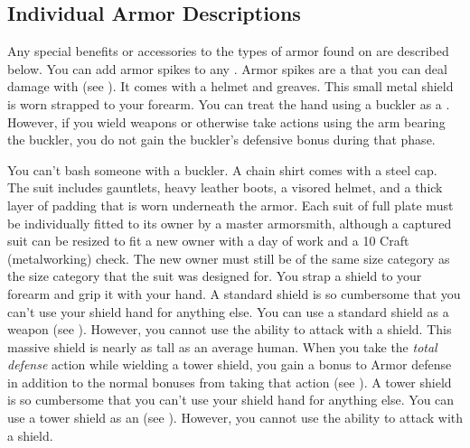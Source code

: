     \subsection{Individual Armor Descriptions}
        Any special benefits or accessories to the types of armor found on  are described below.
         You can add armor spikes to any .
        Armor spikes are a  that you can deal damage with (see ).
         It comes with a helmet and greaves.
         This small metal shield is worn strapped to your forearm.
        You can treat the hand using a buckler as a .
        However, if you wield weapons or otherwise take actions using the arm bearing the buckler, you do not gain the buckler's defensive bonus during that phase.
        \par You can't bash someone with a buckler.
         A chain shirt comes with a steel cap.
         The suit includes gauntlets, heavy leather boots, a visored helmet, and a thick layer of padding that is worn underneath the armor. Each suit of full plate must be individually fitted to its owner by a master armorsmith, although a captured suit can be resized to fit a new owner with a day of work and a  10 Craft (metalworking) check. The new owner must still be of the same size category as the size category that the suit was designed for.
         You strap a shield to your forearm and grip it with your hand.
        A standard shield is so cumbersome that you can't use your shield hand for anything else.
        You can use a standard shield as a weapon (see ).
        However, you cannot use the  ability to attack with a shield.
         This massive shield is nearly as tall as an average human.
        When you take the \textit{total defense} action while wielding a tower shield, you gain a  bonus to Armor defense in addition to the normal bonuses from taking that action (see ).
        A tower shield is so cumbersome that you can't use your shield hand for anything else.
        You can use a tower shield as an  (see ).
        However, you cannot use the  ability to attack with a shield.

